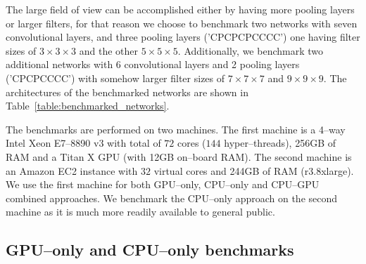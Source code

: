\documentclass[conference]{IEEEtran}
\begin{document}
  The large field of view can be accomplished either by having more
  pooling layers or larger filters, for that reason we choose to
  benchmark two networks with seven convolutional layers, and three
  pooling layers ('CPCPCPCCCC') one having filter sizes of $3\times 3
  \times 3$ and the other $5\times 5\times 5$.  Additionally, we
  benchmark two additional networks with 6 convolutional layers and 2
  pooling layers ('CPCPCCCC') with somehow larger filter sizes of $7
  \times 7 \times 7$ and $9 \times 9 \times 9$.  The architectures of
  the benchmarked networks are shown in
  Table~\ref{table:benchmarked_networks}.

  The benchmarks are performed on two machines.  The first machine is
  a 4--way Intel Xeon E7--8890 v3 with total of $72$ cores ($144$
  hyper--threads), 256GB of RAM and a Titan X GPU (with 12GB on--board
  RAM).  The second machine is an Amazon EC2 instance with $32$
  virtual cores and 244GB of RAM (r3.8xlarge).  We use the first
  machine for both GPU--only, CPU--only and CPU--GPU combined
  approaches.  We benchmark the CPU--only approach on the second
  machine as it is much more readily available to general public.


\subsection{GPU--only and CPU--only benchmarks}
\end{document}
